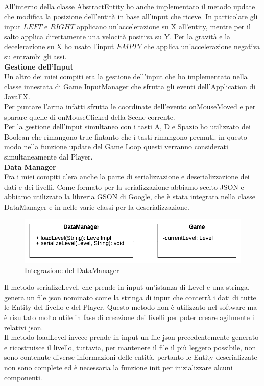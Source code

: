 \documentclass{article}
\begin{document}
All'interno della classe AbstractEntity ho anche implementato il metodo update che modifica la posizione dell'entità in base all'input che riceve.
In particolare gli input {$LEFT$} e {$RIGHT$} applicano un'accelerazione su X all'entity, mentre per il salto applica direttamente una velocità positiva su Y. Per la gravità e la decelerazione su X ho usato l'input {$EMPTY$} che applica un'accelerazione negativa su entrambi gli assi.\\

\textbf{Gestione dell'Input}\\

Un altro dei miei compiti era la gestione dell'input che ho implementato nella classe innestata di Game InputManager che sfrutta gli eventi dell'Application di JavaFX.\\

Per puntare l'arma infatti sfrutta le coordinate dell'evento onMouseMoved e per sparare quelle di onMouseClicked della Scene corrente.\\
Per la gestione dell'input simultaneo con i tasti A, D e Spazio ho utilizzato dei Boolean che rimangono true fintanto che i tasti rimangono premuti. in questo modo nella funzione update del Game Loop questi verranno considerati simultaneamente dal Player.\\
\textbf{Data Manager}\\

Fra i miei compiti c'era anche la parte di serializzazione e deserializzazione dei dati e dei livelli. Come formato per la serializzazione abbiamo scelto JSON e abbiamo utilizzato la libreria GSON di Google, che è stata integrata nella classe DataManager e in nelle varie classi per la deserializzazione.

\begin{figure}[ht]
\includegraphics[width=1\textwidth]{images/DataManager.png}
\caption{Integrazione del DataManager}
\label{fig:datamanager}
\end{figure}

Il metodo serializeLevel, che prende in input un'istanza di Level e una stringa, genera un file json nominato come la stringa di input che conterrà i dati di tutte le Entity del livello e del Player. Questo metodo non è utilizzato nel software ma è risultato molto utile in fase di creazione dei livelli per poter creare agilmente i relativi json.\\
Il metodo loadLevel invece prende in input un file json precedentemente generato e ricostruisce il livello, tuttavia, per mantenere il file il più leggero possibile, non sono contenute diverse informazioni delle entità, pertanto le Entity deserializzate non sono complete ed è necessaria la funzione init per inizializzare alcuni componenti.
\end{document}
